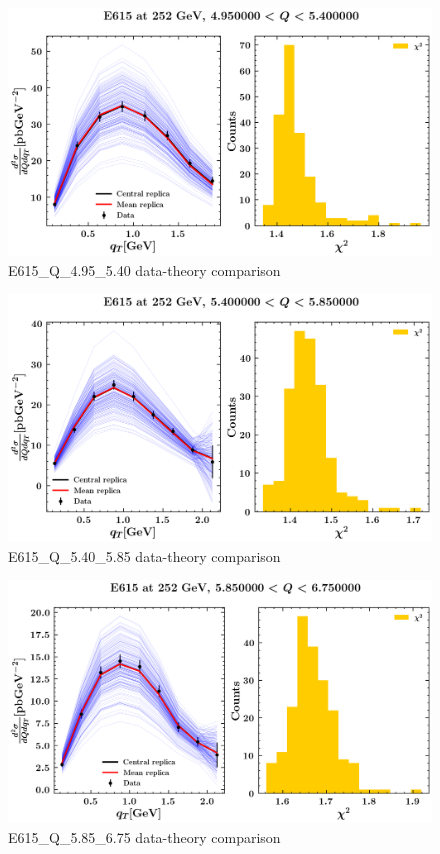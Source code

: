 \documentclass[]{article}
\begin{document}
\begin{figure}
\centering
\includegraphics{pngplots/E615_Q_4.95_5.40.png}
\caption{E615\_Q\_4.95\_5.40 data-theory comparison}
\end{figure}

\begin{figure}
\centering
\includegraphics{pngplots/E615_Q_5.40_5.85.png}
\caption{E615\_Q\_5.40\_5.85 data-theory comparison}
\end{figure}

\begin{figure}
\centering
\includegraphics{pngplots/E615_Q_5.85_6.75.png}
\caption{E615\_Q\_5.85\_6.75 data-theory comparison}
\end{figure}
\end{document}
